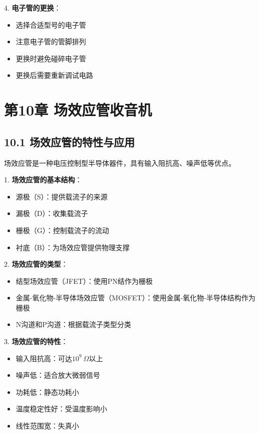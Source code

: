 \documentclass[12pt,UTF8]{ctexbook}
\begin{document}
4. \textbf{电子管的更换}：
   \begin{itemize}[leftmargin=3.5em]
   \item 选择合适型号的电子管
   \item 注意电子管的管脚排列
   \item 更换时避免碰碎电子管
   \item 更换后需要重新调试电路
   \end{itemize}

\chapter*{第10章 场效应管收音机}
\section*{10.1 场效应管的特性与应用}

场效应管是一种电压控制型半导体器件，具有输入阻抗高、噪声低等优点。

1. \textbf{场效应管的基本结构}：
   \begin{itemize}[leftmargin=3.5em]
   \item 源极（S）：提供载流子的来源
   \item 漏极（D）：收集载流子
   \item 栅极（G）：控制载流子的流动
   \item 衬底（B）：为场效应管提供物理支撑
   \end{itemize}

2. \textbf{场效应管的类型}：
   \begin{itemize}[leftmargin=3.5em]
   \item 结型场效应管（JFET）：使用PN结作为栅极
   \item 金属-氧化物-半导体场效应管（MOSFET）：使用金属-氧化物-半导体结构作为栅极
   \item N沟道和P沟道：根据载流子类型分类
   \end{itemize}

3. \textbf{场效应管的特性}：
   \begin{itemize}[leftmargin=3.5em]
   \item 输入阻抗高：可达$10^9\ \Omega$以上
   \item 噪声低：适合放大微弱信号
   \item 功耗低：静态功耗小
   \item 温度稳定性好：受温度影响小
   \item 线性范围宽：失真小
   \end{itemize}
\end{document}
